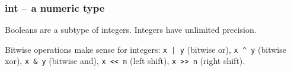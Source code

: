 \subsubsection{int -- a numeric type}
Booleans are a subtype of integers.
Integers have unlimited precision.

Bitwise operations make sense for integers: \texttt{x | y} (bitwise or), \texttt{x ^ y} (bitwise xor), \texttt{x & y} (bitwise and), \texttt{x << n} (left shift), \texttt{x >> n} (right shift).
